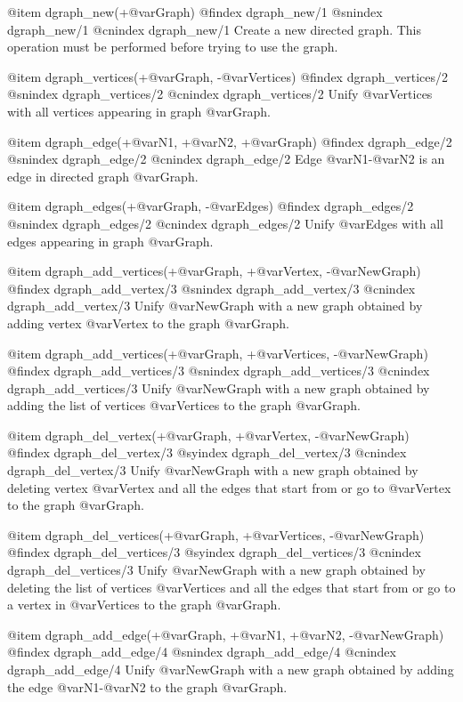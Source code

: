 {{{{{{{{{@item dgraph_new(+@var{Graph})
@findex  dgraph_new/1
@snindex dgraph_new/1
@cnindex dgraph_new/1
Create a new directed graph. This operation must be performed before
trying to use the graph.

@item dgraph_vertices(+@var{Graph}, -@var{Vertices})
@findex  dgraph_vertices/2
@snindex dgraph_vertices/2
@cnindex dgraph_vertices/2
Unify @var{Vertices} with all vertices appearing in graph
@var{Graph}.

@item dgraph_edge(+@var{N1}, +@var{N2}, +@var{Graph})
@findex  dgraph_edge/2
@snindex dgraph_edge/2
@cnindex dgraph_edge/2
Edge @var{N1}-@var{N2} is an edge in directed graph @var{Graph}.

@item dgraph_edges(+@var{Graph}, -@var{Edges})
@findex  dgraph_edges/2
@snindex dgraph_edges/2
@cnindex dgraph_edges/2
Unify @var{Edges} with all edges appearing in graph
@var{Graph}.

@item dgraph_add_vertices(+@var{Graph}, +@var{Vertex}, -@var{NewGraph})
@findex  dgraph_add_vertex/3
@snindex dgraph_add_vertex/3
@cnindex dgraph_add_vertex/3
Unify @var{NewGraph} with a new graph obtained by adding
vertex @var{Vertex} to the graph @var{Graph}.

@item dgraph_add_vertices(+@var{Graph}, +@var{Vertices}, -@var{NewGraph})
@findex  dgraph_add_vertices/3
@snindex dgraph_add_vertices/3
@cnindex dgraph_add_vertices/3
Unify @var{NewGraph} with a new graph obtained by adding the list of
vertices @var{Vertices} to the graph @var{Graph}.

@item dgraph_del_vertex(+@var{Graph}, +@var{Vertex}, -@var{NewGraph})
@findex  dgraph_del_vertex/3
@syindex dgraph_del_vertex/3
@cnindex dgraph_del_vertex/3
Unify @var{NewGraph} with a new graph obtained by deleting vertex
@var{Vertex} and all the edges that start from or go to @var{Vertex} to
the graph @var{Graph}.

@item dgraph_del_vertices(+@var{Graph}, +@var{Vertices}, -@var{NewGraph})
@findex  dgraph_del_vertices/3
@syindex dgraph_del_vertices/3
@cnindex dgraph_del_vertices/3
Unify @var{NewGraph} with a new graph obtained by deleting the list of
vertices @var{Vertices} and all the edges that start from or go to a
vertex in @var{Vertices} to the graph @var{Graph}.

@item dgraph_add_edge(+@var{Graph}, +@var{N1}, +@var{N2}, -@var{NewGraph})
@findex  dgraph_add_edge/4
@snindex dgraph_add_edge/4
@cnindex dgraph_add_edge/4
Unify @var{NewGraph} with a new graph obtained by adding the edge
@var{N1}-@var{N2} to the graph @var{Graph}.

}}}}}}}}}

